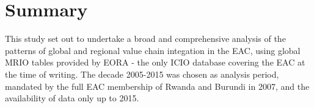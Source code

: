 \documentclass[a4paper]{article}
\begin{document}
%
%
%


\section{Summary}

This study set out to undertake a broad and comprehensive analysis of the patterns of global and regional value chain integation in the EAC, using global MRIO tables provided by EORA - the only ICIO database covering the EAC at the time of writing. The decade 2005-2015 was chosen as analysis period, mandated by the full EAC membership of Rwanda and Burundi in 2007, and the availability of data only up to 2015. \newline
\end{document}
